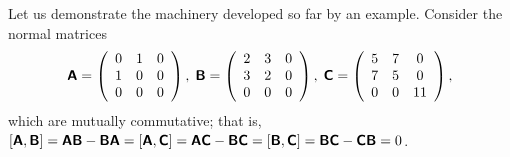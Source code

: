 {\color{blue}
\bexample
Let us demonstrate the machinery developed so far by an example.
Consider the normal matrices
$$
\textsf{\textbf{A}} = \left( \begin{array}{ccc}0& 1& 0\\ 1& 0& 0\\ 0& 0& 0\end{array}\right),\;
\textsf{\textbf{B}} = \left( \begin{array}{ccc}2& 3& 0\\ 3& 2& 0\\ 0& 0& 0\end{array}\right),\;
\textsf{\textbf{C}} = \left( \begin{array}{ccc}5& 7& 0\\ 7& 5& 0\\ 0& 0& 11\end{array}\right),
$$
which are mutually commutative; that is,
$
[\textsf{\textbf{A}}, \textsf{\textbf{B}}]=
\textsf{\textbf{A}} \textsf{\textbf{B}}-\textsf{\textbf{B}}\textsf{\textbf{A}}=
[\textsf{\textbf{A}}, \textsf{\textbf{C}}]=
\textsf{\textbf{A}} \textsf{\textbf{C}}-\textsf{\textbf{B}}\textsf{\textbf{C}}=
[\textsf{\textbf{B}}, \textsf{\textbf{C}}]=
\textsf{\textbf{B}} \textsf{\textbf{C}}-\textsf{\textbf{C}}\textsf{\textbf{B}}=0$.

}
